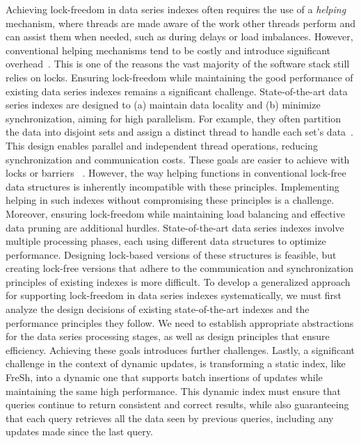 Achieving lock-freedom in data series indexes often requires the use of a {\em helping} mechanism,
where threads are made aware of the work other threads perform and can assist them when
needed, such as during delays or load imbalances. However, conventional helping mechanisms
tend to be costly and introduce significant overhead~\cite{F04,HS08,7515610,Williams2012CCI}.
This is one of the reasons the vast majority of the software stack still relies on locks.
Ensuring lock-freedom while maintaining the good performance of existing data series indexes 
remains a significant challenge.
%
State-of-the-art data series indexes are designed to (a) maintain data locality
and (b) minimize synchronization, aiming for high parallelism. 
For example, they often partition the data into disjoint sets and assign a distinct thread to 
handle each set's data~\cite{parisplus,PFP21-I,PFP21-II}.
This design enables parallel and independent thread operations, reducing synchronization
and communication costs. These goals are easier to achieve with locks or barriers
~\cite{peng2018paris,peng2020messi,PFP21-I,PFP21-II}.
%
However, the way helping functions in conventional lock-free data structures is inherently
incompatible with these principles. Implementing helping in such indexes without compromising
these principles is a challenge.
%
Moreover, ensuring lock-freedom while maintaining load balancing and effective data pruning
are additional hurdles. State-of-the-art data series indexes involve multiple processing phases,
each using different data structures to optimize performance. Designing lock-based versions of
these structures is feasible, but creating lock-free versions that adhere to the communication
and synchronization principles of existing indexes is more difficult.
%
To develop a generalized approach for supporting lock-freedom in data series indexes systematically,
we must first analyze the design decisions of existing state-of-the-art indexes and the performance
principles they follow. We need to establish appropriate abstractions for the data series processing
stages, as well as design principles that ensure efficiency. Achieving these goals introduces further
challenges.
%
Lastly, a significant challenge in the context of dynamic updates, is transforming
a static index, like FreSh, into a dynamic one that supports batch insertions of updates while 
maintaining the same high performance. This dynamic index must ensure that queries continue to 
return consistent and correct results, while also guaranteeing that each query retrieves all the 
data seen by previous queries, including any updates made since the last query.

